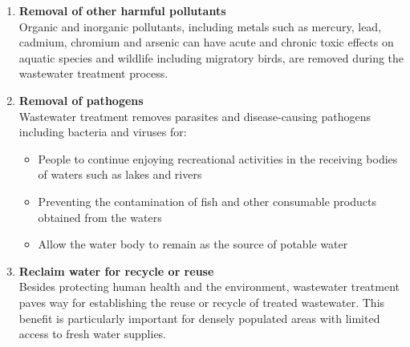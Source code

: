 \begin{enumerate}
\item \textbf{Removal of other harmful pollutants}\\
Organic and inorganic pollutants, including metals such as mercury, lead, cadmium, chromium and arsenic can have acute and chronic toxic effects on aquatic species and wildlife including migratory birds, are removed during the wastewater treatment process.
\item \textbf{Removal of pathogens}\\
Wastewater treatment removes parasites and disease-causing pathogens including bacteria and viruses for:
\begin{itemize}
\item People to continue enjoying recreational activities in the receiving bodies of waters such as lakes and rivers
\item Preventing the contamination of fish and other consumable products obtained from the waters
\item Allow the water body to remain as the source of potable water
\end{itemize}

\item \textbf{Reclaim water for recycle or reuse}\\
Besides protecting human health and the environment, wastewater treatment paves way for establishing the reuse or recycle of treated wastewater.  This benefit is particularly important for densely populated areas with limited access to fresh water supplies.  
\end{enumerate}

